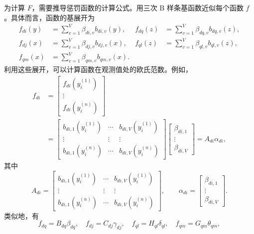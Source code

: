 为计算 $F$，需要推导惩罚函数的计算公式。用三次 B 样条基函数近似每个函数 $f$。具体而言，函数的基展开为
\begin{equation}
\begin{aligned}
f_{di}(y)&=\sum_{v=1}^{V}\beta_{di,v}b_{di,v}(y),&
f_{dq}(z)&=\sum_{v=1}^{V}\beta_{dq,v}b_{dq,v}(z),\\
f_{dj}(x)&=\sum_{v=1}^{V}\beta_{dj,v}b_{dj,v}(x),&
f_{ql}(z)&=\sum_{v=1}^{V}\beta_{ql,v}b_{ql,v}(z),\\
f_{qm}(x)&=\sum_{v=1}^{V}\beta_{qm,v}b_{qm,v}(x).&&
\end{aligned}
\tag{7.211}
\end{equation}
利用这些展开，可以计算函数在观测值处的欧氏范数。例如，
\begin{equation}
\begin{aligned}
f_{di}&=\begin{bmatrix}f_{di}(y_i^{(1)})\\\vdots\\f_{di}(y_i^{(n)})\end{bmatrix}\\
&=\begin{bmatrix}
b_{di,1}(y_i^{(1)})&\cdots&b_{di,V}(y_i^{(1)})\\
\vdots&\vdots&\vdots\\
b_{di,1}(y_i^{(n)})&\cdots&b_{di,V}(y_i^{(n)})
\end{bmatrix}
\begin{bmatrix}\beta_{di,1}\\\vdots\\\beta_{di,V}\end{bmatrix}
=A_{di}\alpha_{di},
\end{aligned}
\tag{7.212}
\end{equation}
其中
\[
A_{di}=\begin{bmatrix}
b_{di,1}(y_i^{(1)})&\cdots&b_{di,V}(y_i^{(1)})\\
\vdots&\vdots&\vdots\\
b_{di,1}(y_i^{(n)})&\cdots&b_{di,V}(y_i^{(n)})
\end{bmatrix},\qquad
\alpha_{di}=\begin{bmatrix}\beta_{di,1}\\\vdots\\\beta_{di,V}\end{bmatrix}.
\]
类似地，有
\begin{equation}
f_{dq}=B_{dq}\beta_{dq},\quad f_{dj}=C_{dj}\gamma_{dj},\quad
f_{ql}=H_{ql}\delta_{ql},\quad f_{qm}=G_{qm}\theta_{qm},
\tag{7.213}
\end{equation}
